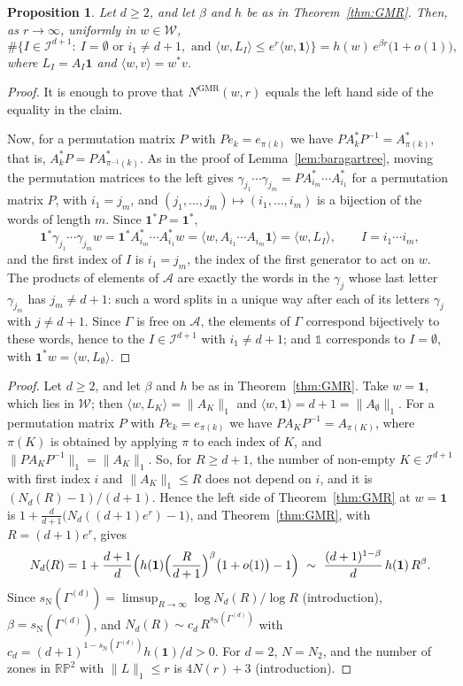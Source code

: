 \documentclass[11pt]{amsart}
\newcommand{\id}{\mathds{1}}
\newtheorem{proposition}{Proposition}[section]
\theoremstyle{definition}
\theoremstyle{remark}
\newcommand{\one}{\mathbf 1}
\newcommand{\RP}{\mathbb{RP}}
\newcommand{\cI}{\mathcal I}
\newcommand{\sN}{s_{\mathrm N}}
\newcommand{\norm}[1]{\lVert #1\rVert}
\newcommand{\pr}[1]{\langle #1\rangle}
\begin{document}
\begin{proposition}\label{lem:GMRdict}
Let $d\ge2$, and let $\beta$ and $h$ be as in Theorem~\ref{thm:GMR}. Then, as $r\to\infty$, uniformly in $w\in\mathcal W$,
\[
  \#\bigl\{I\in\cI^{d+1}:\ I=\emptyset\text{ or } i_1\neq d+1,\text{ and }\pr{w,L_I}\le e^r\pr{w,\one}\bigr\}=h(w)\,e^{\beta r}\bigl(1+o(1)\bigr),
\]
where $L_I=A_I\one$ and $\pr{w,v}=w^*v$.
\end{proposition}

\begin{proof}
    It is enough to prove that $N^{\mathrm{GMR}}(w,r)$ equals the left hand side of the equality in the claim.

    Now, for a permutation matrix $P$ with $Pe_k=e_{\pi(k)}$ we have $PA_k^*P^{-1}=A_{\pi(k)}^*$, that is, $A_k^*P=PA^*_{\pi^{-1}(k)}$.
    As in the proof of Lemma~\ref{lem:baragartree}, moving the permutation matrices to the left gives $\gamma_{j_1}\cdots\gamma_{j_m}=PA_{i_m}^*\cdots A_{i_1}^*$ for a permutation matrix $P$, with $i_1=j_m$, and $(j_1,\dots,j_m)\mapsto(i_1,\dots,i_m)$ is a bijection of the words of length $m$.
    Since $\one^*P=\one^*$,
\[
  \one^*\gamma_{j_1}\cdots\gamma_{j_m}w=\one^*A_{i_m}^*\cdots A_{i_1}^*w=\pr{w,A_{i_1}\cdots A_{i_m}\one}=\pr{w,L_I},\qquad I=i_1\cdots i_m,
\]
    and the first index of $I$ is $i_1=j_m$, the index of the first generator to act on $w$.
    The products of elements of $\mathcal A$ are exactly the words in the $\gamma_j$ whose last letter $\gamma_{j_m}$ has $j_m\ne d+1$: such a word splits in a unique way after each of its letters $\gamma_j$ with $j\ne d+1$.
    Since $\Gamma$ is free on $\mathcal A$, the elements of $\Gamma$ correspond bijectively to these words, hence to the $I\in\cI^{d+1}$ with $i_1\neq d+1$; and $\id$ corresponds to $I=\emptyset$, with $\one^*w=\pr{w,L_\emptyset}$.
\end{proof}

\thmcount*

\begin{proof}
Let $d\ge2$, and let $\beta$ and $h$ be as in Theorem~\ref{thm:GMR}. Take $w=\one$, which lies in $\mathcal W$; then $\pr{w,L_K}=\norm{A_K}_1$ and $\pr{w,\one}=d+1=\norm{A_\emptyset}_1$. For a permutation matrix $P$ with $Pe_k=e_{\pi(k)}$ we have $PA_KP^{-1}=A_{\pi(K)}$, where $\pi(K)$ is obtained by applying $\pi$ to each index of $K$, and $\norm{PA_KP^{-1}}_1=\norm{A_K}_1$. So, for $R\ge d+1$, the number of non-empty $K\in\cI^{d+1}$ with first index $i$ and $\norm{A_K}_1\le R$ does not depend on $i$, and it is $(N_d(R)-1)/(d+1)$. Hence the left side of Theorem~\ref{thm:GMR} at $w=\one$ is $1+\frac d{d+1}\bigl(N_d((d+1)e^r)-1\bigr)$, and Theorem~\ref{thm:GMR}, with $R=(d+1)e^r$, gives
\[
  N_d(R)=1+\frac{d+1}d\Bigl(h(\one)\Bigl(\frac R{d+1}\Bigr)^{\beta}\bigl(1+o(1)\bigr)-1\Bigr)\ \sim\ \frac{(d+1)^{1-\beta}}d\,h(\one)\,R^\beta .
\]
Since $\sN(\Gamma^{(d)})=\limsup_{R\to\infty}\log N_d(R)/\log R$ (introduction), $\beta=\sN(\Gamma^{(d)})$, and $N_d(R)\sim c_d\,R^{\sN(\Gamma^{(d)})}$ with $c_d=(d+1)^{1-\sN(\Gamma^{(d)})}h(\one)/d>0$. For $d=2$, $N=N_2$, and the number of zones in $\RP^2$ with $\norm L_1\le r$ is $4N(r)+3$ (introduction).
\end{proof}
\end{document}
